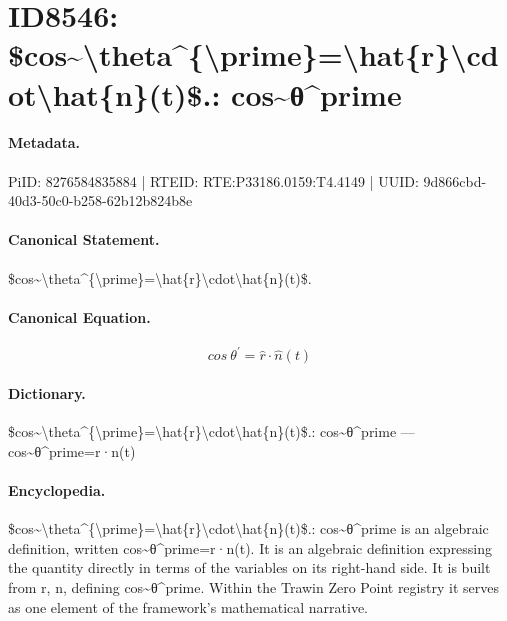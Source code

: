 \section*{ID8546: \$cos\textasciitilde{}\textbackslash{}theta\textasciicircum{}\{\textbackslash{}prime\}=\textbackslash{}hat\{r\}\textbackslash{}cdot\textbackslash{}hat\{n\}(t)\$.: cos\textasciitilde{}θ\textasciicircum{}prime}
\paragraph{Metadata.}
PiID: 8276584835884 | RTEID: RTE:P33186.0159:T4.4149 | UUID: 9d866cbd-40d3-50c0-b258-62b12b824b8e

\paragraph{Canonical Statement.}
\$cos\textasciitilde{}\textbackslash{}theta\textasciicircum{}\{\textbackslash{}prime\}=\textbackslash{}hat\{r\}\textbackslash{}cdot\textbackslash{}hat\{n\}(t)\$.

\paragraph{Canonical Equation.}
\[
cos~\theta^{\prime}=\hat{r}\cdot\hat{n}(t)
\]

\paragraph{Dictionary.}
\$cos\textasciitilde{}\textbackslash{}theta\textasciicircum{}\{\textbackslash{}prime\}=\textbackslash{}hat\{r\}\textbackslash{}cdot\textbackslash{}hat\{n\}(t)\$.: cos\textasciitilde{}θ\textasciicircum{}prime — cos\textasciitilde{}θ\textasciicircum{}prime=r·n(t)

\paragraph{Encyclopedia.}
\$cos\textasciitilde{}\textbackslash{}theta\textasciicircum{}\{\textbackslash{}prime\}=\textbackslash{}hat\{r\}\textbackslash{}cdot\textbackslash{}hat\{n\}(t)\$.: cos\textasciitilde{}θ\textasciicircum{}prime is an algebraic definition, written cos\textasciitilde{}θ\textasciicircum{}prime=r·n(t). It is an algebraic definition expressing the quantity directly in terms of the variables on its right-hand side. It is built from r, n, defining cos\textasciitilde{}θ\textasciicircum{}prime. Within the Trawin Zero Point registry it serves as one element of the framework's mathematical narrative.
